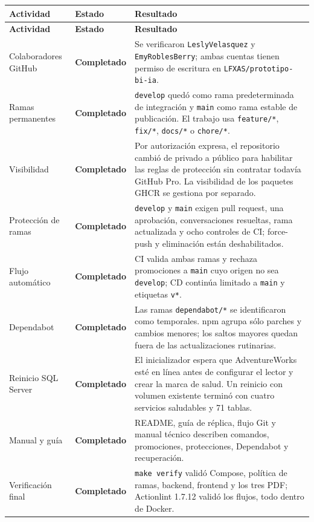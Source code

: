 \documentclass[11pt,letterpaper]{article}
\newcommand{\statusok}{\textcolor{deepgreen}{\textbf{Completado}}}
\newcommand{\file}[1]{\texttt{#1}}
\begin{document}
\begin{longtable}{@{}p{}p{}p{}@{}}
  \toprule
  \textbf{Actividad} & \textbf{Estado} & \textbf{Resultado} \\
  \midrule
  \endfirsthead
  \toprule
  \textbf{Actividad} & \textbf{Estado} & \textbf{Resultado} \\
  \midrule
  \endhead
  Colaboradores GitHub & \statusok & Se verificaron \file{LeslyVelasquez} y \file{EmyRoblesBerry}; ambas cuentas tienen permiso de escritura en \file{LFXAS/prototipo-bi-ia}. \\
  Ramas permanentes & \statusok & \file{develop} quedó como rama predeterminada de integración y \file{main} como rama estable de publicación. El trabajo usa \file{feature/*}, \file{fix/*}, \file{docs/*} o \file{chore/*}. \\
  Visibilidad & \statusok & Por autorización expresa, el repositorio cambió de privado a público para habilitar las reglas de protección sin contratar todavía GitHub Pro. La visibilidad de los paquetes GHCR se gestiona por separado. \\
  Protección de ramas & \statusok & \file{develop} y \file{main} exigen pull request, una aprobación, conversaciones resueltas, rama actualizada y ocho controles de CI; force-push y eliminación están deshabilitados. \\
  Flujo automático & \statusok & CI valida ambas ramas y rechaza promociones a \file{main} cuyo origen no sea \file{develop}; CD continúa limitado a \file{main} y etiquetas \file{v*}. \\
  Dependabot & \statusok & Las ramas \file{dependabot/*} se identificaron como temporales. npm agrupa sólo parches y cambios menores; los saltos mayores quedan fuera de las actualizaciones rutinarias. \\
  Reinicio SQL Server & \statusok & El inicializador espera que AdventureWorks esté en línea antes de configurar el lector y crear la marca de salud. Un reinicio con volumen existente terminó con cuatro servicios saludables y 71 tablas. \\
  Manual y guía & \statusok & README, guía de réplica, flujo Git y manual técnico describen comandos, promociones, protecciones, Dependabot y recuperación. \\
  Verificación final & \statusok & \file{make verify} validó Compose, política de ramas, backend, frontend y los tres PDF; Actionlint 1.7.12 validó los flujos, todo dentro de Docker. \\
  \bottomrule
\end{longtable}
\end{document}
